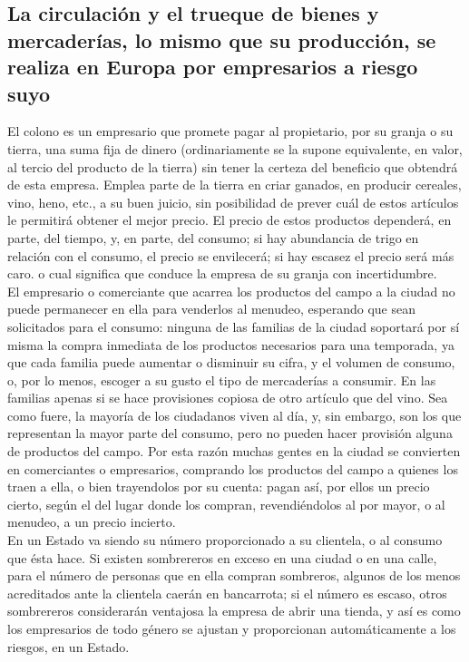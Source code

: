 \documentclass[10pt]{article}
\begin{document}
\begin{multicols}{1}
\section*{La circulación y el trueque de bienes y mercaderías, lo mismo que su producción, se realiza en Europa por empresarios a riesgo suyo}
El colono es un empresario que promete pagar al propietario, por su granja o su tierra, una suma fija de dinero (ordinariamente se la supone equivalente, en valor, al tercio del producto de la tierra) sin tener la certeza del beneficio que obtendrá de esta empresa. Emplea parte de la tierra en criar ganados, en producir cereales, vino, heno, etc., a su buen juicio, sin posibilidad de prever cuál de estos artículos le permitirá obtener el mejor precio. El precio de estos productos dependerá, en parte, del tiempo, y, en parte, del consumo; si hay abundancia de trigo en relación con el consumo, el precio se envilecerá; si hay escasez el precio será más caro. o cual significa que conduce la empresa de su granja con incertidumbre.\\
El empresario o comerciante que acarrea los productos del campo a la ciudad no puede permanecer en ella para venderlos al menudeo, esperando que sean solicitados para el consumo: ninguna de las familias de la ciudad soportará por sí misma la compra inmediata de los productos necesarios para una temporada, ya que cada familia puede aumentar o disminuir su cifra, y el volumen de consumo, o, por lo menos, escoger a su gusto el tipo de mercaderías a consumir. En las familias apenas si se hace provisiones copiosa de otro artículo que del vino. Sea como fuere, la mayoría de los ciudadanos viven al día, y, sin embargo, son los que representan la mayor parte del consumo, pero no pueden hacer provisión alguna de productos del campo. Por esta razón muchas gentes en la ciudad se convierten en comerciantes o empresarios, comprando los productos del campo a quienes los traen a ella, o bien trayendolos por su cuenta: pagan así, por ellos un precio cierto, según el del lugar donde los compran, revendiéndolos al por mayor, o al menudeo, a un precio incierto.\\
En un Estado va siendo su número proporcionado a su clientela, o al consumo que ésta hace. Si existen sombrereros en exceso en una ciudad o en una calle, para el número de personas que en ella compran sombreros, algunos de los menos acreditados ante la clientela caerán en bancarrota; si el número es escaso, otros sombrereros considerarán ventajosa la empresa de abrir una tienda, y así es como los empresarios de todo género se ajustan y proporcionan automáticamente a los riesgos, en un Estado.\\

\end{multicols}
\end{document}
